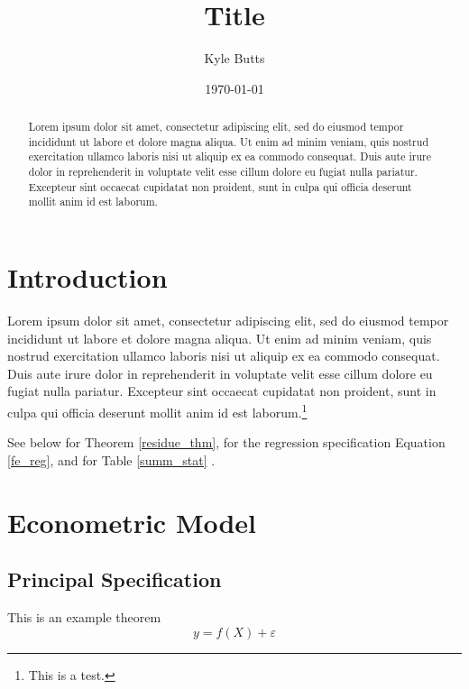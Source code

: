 \documentclass[11pt]{article}
\title{Title}
\date{\today}
\author{Kyle Butts}
\begin{document}
\maketitle
\begin{abstract}
    Lorem ipsum dolor sit amet, consectetur adipiscing elit, sed do eiusmod tempor incididunt ut labore et dolore magna aliqua. Ut enim ad minim veniam, quis nostrud exercitation ullamco laboris nisi ut aliquip ex ea commodo consequat. Duis aute irure dolor in reprehenderit in voluptate velit esse cillum dolore eu fugiat nulla pariatur. Excepteur sint occaecat cupidatat non proident, sunt in culpa qui officia deserunt mollit anim id est laborum.
\end{abstract}

\newpage

\section{Introduction}

Lorem ipsum dolor sit amet, consectetur adipiscing elit, sed do eiusmod tempor incididunt ut labore et dolore magna aliqua. Ut enim ad minim veniam, quis nostrud exercitation ullamco laboris nisi ut aliquip ex ea commodo consequat. Duis aute irure dolor in reprehenderit in voluptate velit esse cillum dolore eu fugiat nulla pariatur. Excepteur sint occaecat cupidatat non proident, sunt in culpa qui officia deserunt mollit anim id est laborum.\footnote{This is a test.}

See below for Theorem \ref{residue_thm}, for the regression specification Equation \ref{fe_reg}, and for Table \ref{summ_stat} \citep{Eigen1971}. 

\section{Econometric Model}

\subsection{Principal Specification}

\begin{theorem}\label{residue_thm}
    This is an example theorem \[ 
        y = f(X) + \varepsilon 
    \]
\end{theorem}
\end{document}
